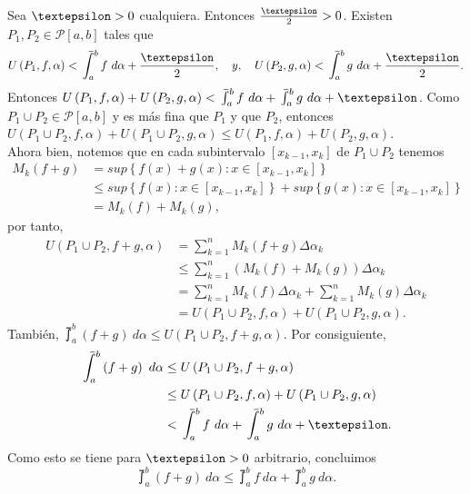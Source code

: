 Sea $\text{\textepsilon}>0$ cualquiera. Entonces $\frac{\text{\textepsilon}}{2}>0$. Existen $P_1,P_2\in\mathcal{P}\left[a,b\right]$ tales que
  \begin{equation*}
    U\left(P_1,f,\alpha\right) < \upint_a^b f\ d\alpha + \frac{\text{\textepsilon}}{2},\quad y,\quad U\left(P_2,g,\alpha\right) < \upint_a^b g\ d\alpha + \frac{\text{\textepsilon}}{2}.
  \end{equation*}
  Entonces $U\left(P_1,f,\alpha\right)+U\left(P_2,g,\alpha\right)<\upint_a^b f\ d\alpha + \upint_a^b g\ d\alpha + \text{\textepsilon}$. Como $P_1\cup P_2 \in \mathcal{P}\left[a,b\right]$ y es más fina que $P_1$ y que $P_2$, entonces $U\left(P_1\cup P_2,f,\alpha\right)+U\left(P_1\cup P_2,g,\alpha\right) \leq U\left(P_1,f,\alpha\right)+U\left(P_2,g,\alpha\right)$.\\
  Ahora bien, notemos que en cada subintervalo $\left[x_{k-1},x_k\right]$ de $P_1\cup P_2$ tenemos
  \begin{align*}
    M_k\left(f+g\right)&= sup\left\lbrace f\left(x\right)+g\left(x\right): x\in\left[x_{k-1},x_k\right]\right\rbrace\\
    &\leq sup\left\lbrace f\left(x\right): x\in\left[x_{k-1},x_k\right]\right\rbrace+sup\left\lbrace g\left(x\right): x\in\left[x_{k-1},x_k\right]\right\rbrace\\
    &=M_k\left(f\right)+M_k\left(g\right),
  \end{align*}
por tanto,
\begin{align*}
  U\left(P_1\cup P_2, f+g, \alpha\right)&= \sum_{k=1}^{n} M_k\left(f+g\right)\Delta\alpha_k\\
  &\leq\sum_{k=1}^{n} \left(M_k\left(f\right)+M_k\left(g\right)\right)\Delta\alpha_k\\
  &=\sum_{k=1}^{n} M_k\left(f\right)\Delta\alpha_k+\sum_{k=1}^{n} M_k\left(g\right)\Delta\alpha_k\\
  &=U\left(P_1\cup P_2, f, \alpha\right)+U\left(P_1\cup P_2, g, \alpha\right).
\end{align*}
También, $\upint_a^b\left(f+g\right)\ d\alpha \leq U\left(P_1\cup P_2, f+g, \alpha\right)$. Por consiguiente,
\begin{align*}
\upint_a^b \left(f+g\right)\ d\alpha &\leq U\left(P_1\cup P_2, f+g, \alpha\right)\\
&\leq U\left(P_1\cup P_2, f, \alpha\right)+U\left(P_1\cup P_2, g, \alpha\right)\\
&< \upint_a^b f\ d\alpha + \upint_a^b g\ d\alpha +  \text{\textepsilon}.
\end{align*}
Como esto se tiene para $\text{\textepsilon}>0$ arbitrario, concluimos
\begin{equation*}
\upint_a^b \left(f+g\right)\ d\alpha \leq \upint_a^b f\ d\alpha + \upint_a^b g\ d\alpha .
\end{equation*}

